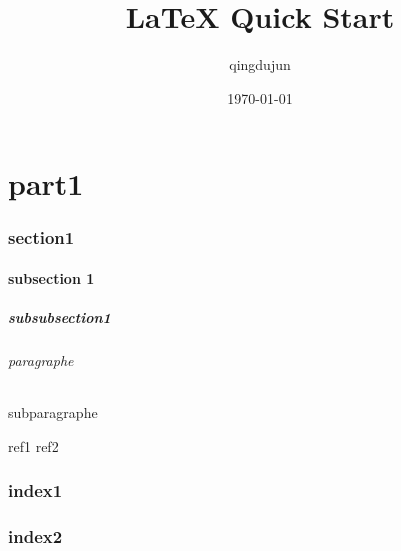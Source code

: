 \documentclass[11pt, a4paper]{article}
\title{LaTeX Quick Start}
\author{qingdujun}
\date{\today}
\begin{document}
\maketitle
\part{ part1}
\section{section1 }
\subsection{subsection 1}
\subsubsection{subsubsection1  }
\paragraph{paragraphe }
\subparagraph{subparagraphe  }
\begin{thebibliography}{99}
  ref1
  ref2
\end{thebibliography}
\begin{appendix}
\section{index1}
\section{index2}
\end{appendix}
\end{document}
